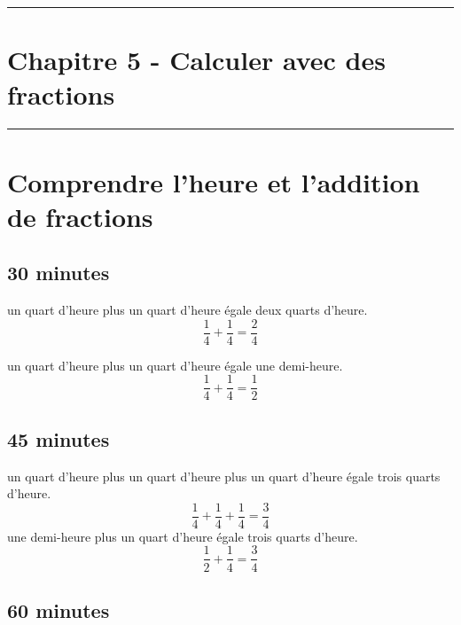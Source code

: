 \documentclass[12pt]{article}
\newcommand{\horrule}[1]{\rule{\linewidth}{#1}} %
\begin{document}

\newtheorem{Definition}{Définition}
\newtheorem{Theorem}{Théorème}
\newtheorem{Proposition}{Propriété}

\renewcommand{\labelitemi}{$\bullet$}
\renewcommand{\labelitemii}{$\circ$}

\setlength{\columnseprule}{1pt}

\horrule{2px}
\section*{Chapitre 5 - Calculer avec des fractions}
\horrule{2px}

\section*{Comprendre l'heure et l'addition de fractions}

\subsection*{30 minutes}

un quart d'heure plus un quart d'heure égale deux quarts d'heure.
$$\dfrac{1}{4} + \dfrac{1}{4} = \dfrac{2}{4}$$

un quart d'heure plus un quart d'heure égale une demi-heure.
$$\dfrac{1}{4} + \dfrac{1}{4} = \dfrac{1}{2}$$

\subsection*{45 minutes}

un quart d'heure plus un quart d'heure plus un quart d'heure égale trois quarts d'heure.
$$\dfrac{1}{4} + \dfrac{1}{4} + \dfrac{1}{4} = \dfrac{3}{4}$$
une demi-heure plus un quart d'heure égale trois quarts d'heure.
$$\dfrac{1}{2} + \dfrac{1}{4} = \dfrac{3}{4}$$

\subsection*{60 minutes}
\end{document}
